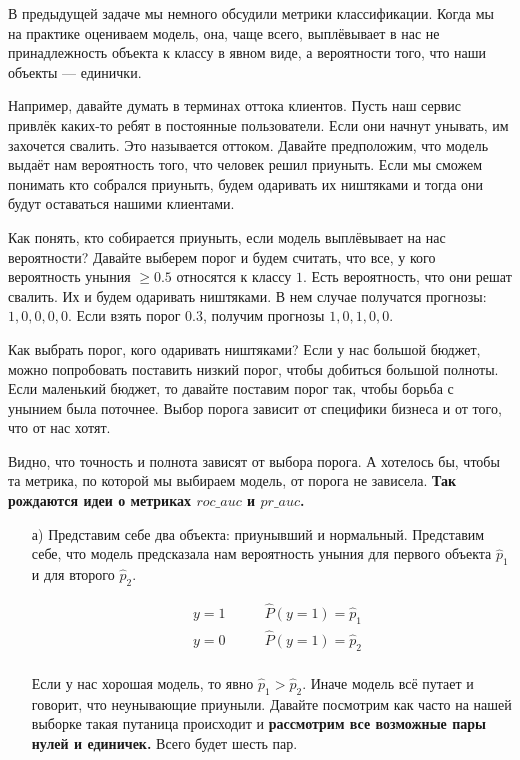\documentclass[12pt, a4paper, oneside]{article}
\theoremstyle{plain} %
\theoremstyle{definition}
\newcommand{\indef}[1]{\textbf{ \color{green} #1}}
\begin{document}
\begin{solution}
В предыдущей задаче мы немного обсудили метрики классификации. Когда мы на практике оцениваем модель, она, чаще всего, выплёвывает в нас не принадлежность объекта к классу в явном виде, а вероятности того, что наши объекты --- единички. 
		
Например, давайте думать в терминах оттока клиентов. Пусть наш сервис привлёк каких-то ребят в постоянные пользователи. Если они начнут унывать, им захочется свалить. Это называется оттоком. Давайте предположим, что модель выдаёт нам вероятность того, что человек решил приуныть. Если мы сможем понимать кто собрался приуныть, будем одаривать их ништяками и тогда они будут оставаться нашими клиентами. 
	
Как понять, кто собирается приуныть, если модель выплёвывает на нас вероятности? Давайте выберем порог и будем считать, что все, у кого вероятность уныния $\ge 0.5$  относятся к классу $1$. Есть вероятность, что они решат свалить. Их и будем одаривать ништяками. В нем случае получатся прогнозы: $1,0,0,0,0$. Если взять порог $0.3$, получим прогнозы $1,0,1,0,0$. 

Как выбрать порог, кого одаривать ништяками? Если у нас большой бюджет, можно попробовать поставить низкий порог, чтобы добиться большой полноты. Если маленький бюджет, то давайте поставим порог так, чтобы борьба с унынием была поточнее. Выбор порога зависит от специфики бизнеса и от того, что от нас хотят. 
	
Видно, что точность и полнота зависят от выбора порога. А хотелось бы, чтобы та метрика, по которой мы выбираем модель, от порога не зависела. \indef{Так рождаются идеи о метриках $roc\_auc$ и $pr\_auc$.} 

\begin{enumerate}	
    \item[а)]  Представим себе два объекта: приунывший и нормальный. Представим себе, что модель предсказала нам вероятность уныния для первого объекта $\hat p_1$ и для второго $\hat p_2$.
	
	\begin{equation} 
	\begin{aligned}
	&y = 1   \qquad &\hat P(y = 1) = \hat p_1\\ 
	&y = 0  \qquad & \hat P(y = 1) = \hat p_2\\ 
	\end{aligned}
	\end{equation} 
	
	Если у нас хорошая модель, то явно $\hat p_1 > \hat p_2$. Иначе модель всё путает и говорит, что неунывающие приуныли. Давайте посмотрим как часто на нашей выборке такая путаница происходит и \indef{рассмотрим все возможные пары нулей и единичек.} Всего будет шесть пар. 
	

\end{enumerate}
\end{solution}
\end{document}
